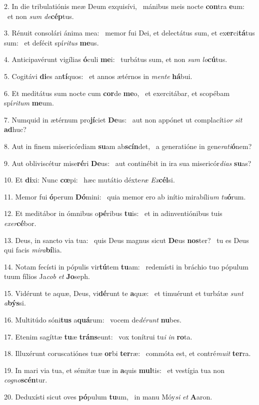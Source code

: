 2. In die tribulatiónis meæ Deum exquisívi, \dag\  mánibus meis nocte \textbf{con}tra \textbf{e}um: \ast\  et non \textit{sum} \textit{de}\textbf{cép}tus.\

3. Rénuit consolári ánima mea: \dag\  memor fui Dei, et delectátus sum, et ex\textbf{er}ci\textbf{tá}tus sum: \ast\  et defécit spí\textit{ri}\textit{tus} \textbf{me}us.\

4. Anticipavérunt vigílias \textbf{ó}culi \textbf{me}i: \ast\  turbátus sum, et non \textit{sum} \textit{lo}\textbf{cú}tus.\

5. Cogitávi \textbf{di}es an\textbf{tí}quos: \ast\  et annos ætérnos in \textit{men}\textit{te} \textbf{há}bui.\

6. Et meditátus sum nocte cum \textbf{cor}de \textbf{me}o, \ast\  et exercitábar, et scopébam spí\textit{ri}\textit{tum} \textbf{me}um.\

7. Numquid in ætérnum pro\textbf{jí}ciet \textbf{De}us: \ast\  aut non appónet ut complacíti\textit{or} \textit{sit} \textbf{ad}huc?\

8. Aut in finem misericórdiam \textbf{su}am ab\textbf{scín}det, \ast\  a generatióne in gene\textit{ra}\textit{ti}\textbf{ó}nem?\

9. Aut obliviscétur mise\textbf{ré}ri \textbf{De}us: \ast\  aut continébit in ira sua misericór\textit{di}\textit{as} \textbf{su}as?\

10. Et \textbf{di}xi: Nunc \textbf{cœ}pi: \ast\  hæc mutátio déxte\textit{ræ} \textit{Ex}\textbf{cél}si.\

11. Memor fui \textbf{ó}perum \textbf{Dó}mini: \ast\  quia memor ero ab inítio mirabíli\textit{um} \textit{tu}\textbf{ó}rum.\

12. Et meditábor in ómnibus o\textbf{pé}ribus \textbf{tu}is: \ast\  et in adinventiónibus tuis \textit{ex}\textit{er}\textbf{cé}bor.\

13. Deus, in sancto via tua: \dag\  quis Deus magnus sicut \textbf{De}us \textbf{nos}ter? \ast\  tu es Deus qui facis \textit{mi}\textit{ra}\textbf{bí}lia.\

14. Notam fecísti in pópulis vir\textbf{tú}tem \textbf{tu}am: \ast\  redemísti in bráchio tuo pópulum tuum fílios Ja\textit{cob} \textit{et} \textbf{Jo}seph.\

15. Vidérunt te aquæ, Deus, vi\textbf{dé}runt te \textbf{a}quæ: \ast\  et timuérunt et turbátæ \textit{sunt} \textit{a}\textbf{býs}si.\

16. Multitúdo sóni\textbf{tus} a\textbf{quá}rum: \ast\  vocem de\textit{dé}\textit{runt} \textbf{nu}bes.\

17. Etenim sagíttæ \textbf{tu}æ \textbf{tráns}eunt: \ast\  vox tonítrui tu\textit{i} \textit{in} \textbf{ro}ta.\

18. Illuxérunt coruscatiónes tuæ \textbf{or}bi \textbf{ter}ræ: \ast\  commóta est, et contré\textit{mu}\textit{it} \textbf{ter}ra.\

19. In mari via tua, et sémitæ tuæ in \textbf{a}quis \textbf{mul}tis: \ast\  et vestígia tua non \textit{co}\textit{gno}\textbf{scén}tur.\

20. Deduxísti sicut oves \textbf{pó}pulum \textbf{tu}um, \ast\  in manu Móy\textit{si} \textit{et} \textbf{A}aron.\

